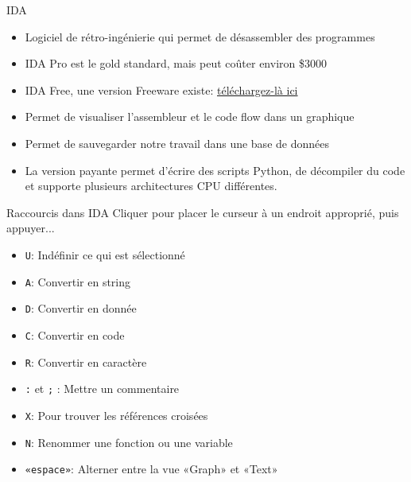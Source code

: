 \documentclass[10pt,xcolor={table,dvipsnames},t]{beamer}
\begin{document}
\begin{frame}{IDA}

    \begin{itemize}
        \item Logiciel de rétro-ingénierie qui permet de désassembler des programmes
        \item IDA Pro est le gold standard, mais peut coûter environ \$3000
        \item IDA Free, une version Freeware existe: \href{https://www.hex-rays.com/products/ida/support/download_freeware.shtml}{téléchargez-là ici} 
        \item Permet de visualiser l'assembleur et le code flow dans un graphique
        \item Permet de sauvegarder notre travail dans une base de données
        \item La version payante permet d'écrire des scripts Python, de décompiler du code et supporte plusieurs architectures CPU différentes.
    \end{itemize}
\end{frame}


\begin{frame}{Raccourcis dans IDA}
    Cliquer pour placer le curseur à un endroit approprié, puis appuyer...
    \begin{itemize}
        \item \texttt{U}: Indéfinir ce qui est sélectionné
        \item \texttt{A}: Convertir en string
        \item \texttt{D}: Convertir en donnée
        \item \texttt{C}: Convertir en code
        \item \texttt{R}: Convertir en caractère
        \item \texttt{:} et \texttt{;} : Mettre un commentaire
        \item \texttt{X}: Pour trouver les références croisées
        \item \texttt{N}: Renommer une fonction ou une variable
        \item \texttt{«espace»}: Alterner entre la vue «Graph» et «Text»
    \end{itemize}
\end{frame}
\end{document}
